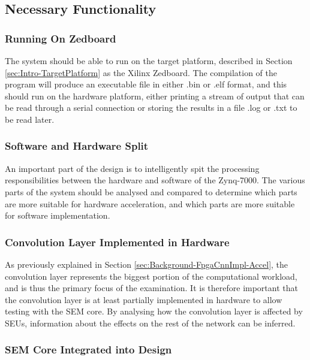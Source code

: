 \documentclass[12pt]{article}
\begin{document}
\subsection{Necessary Functionality}
\label{sec:ProjSpec-Necessary}

\subsubsection{Running On Zedboard}
\label{sec:ProjSpec-Necessary-Zedboard}

The system should be able to run on the target platform, described in Section \ref{sec:Intro-TargetPlatform} as the Xilinx Zedboard. The compilation of the program will produce an executable file in either .bin or .elf format, and this should run on the hardware platform, either printing a stream of output that can be read through a serial connection or storing the results in a file .log or .txt to be read later.

\subsubsection{Software and Hardware Split}
\label{sec:ProjSpec-Necessary-split}

An important part of the design is to intelligently spit the processing responsibilities between the hardware and software of the Zynq-7000. The various parts of the system should be analysed and compared to determine which parts are more suitable for hardware acceleration, and which parts are more suitable for software implementation.

\subsubsection{Convolution Layer Implemented in Hardware}
\label{sec:ProjSpec-Necessary-Conv}

As previously explained in Section \ref{sec:Background-FpgaCnnImpl-Accel}, the convolution layer represents the biggest portion of the computational workload, and is thus the primary focus of the examination. It is therefore important that the convolution layer is at least partially implemented in hardware to allow testing with the SEM core. By analysing how the convolution layer is affected by SEUs, information about the effects on the rest of the network can be inferred.

\subsubsection{SEM Core Integrated into Design}
\label{sec:ProjSpec-Necessary-SEM}
\end{document}

